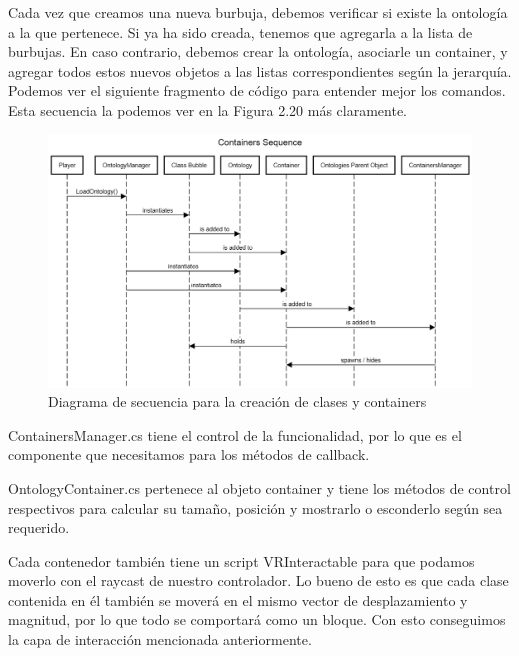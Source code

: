 Cada vez que creamos una nueva burbuja, debemos verificar si existe la ontología a la que pertenece. Si ya ha sido creada, tenemos que agregarla a la lista de burbujas. En caso contrario, debemos crear la ontología, asociarle un container, y agregar todos estos nuevos objetos a las listas correspondientes según la jerarquía. Podemos ver el siguiente fragmento de código para entender mejor los comandos. Esta secuencia la podemos ver en la Figura 2.20 más claramente.

\begin{figure}[ht]
   \begin{center}
      \includegraphics[width=1\linewidth]{chapter2/figures/container_sequence.png}
   \end{center}
   \caption[Diagrama de secuencia para la creación de clases y containers]
   {\footnotesize Diagrama de secuencia para la creación de clases y containers}
\end{figure}



ContainersManager.cs tiene el control de la funcionalidad, por lo que es el componente que necesitamos para los métodos de callback.

OntologyContainer.cs pertenece al objeto container y tiene los métodos de control respectivos para calcular su tamaño, posición y mostrarlo o esconderlo según sea requerido.

Cada contenedor también tiene un script VRInteractable para que podamos moverlo con el raycast de nuestro controlador. Lo bueno de esto es que cada clase contenida en él también se moverá en el mismo vector de desplazamiento y magnitud, por lo que todo se comportará como un bloque. Con esto conseguimos la capa de interacción mencionada anteriormente.


